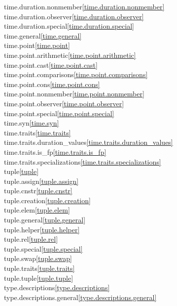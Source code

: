 \begin{multicols}{2}
time.duration.nonmember\quad\ref{time.duration.nonmember}\\
time.duration.observer\quad\ref{time.duration.observer}\\
time.duration.special\quad\ref{time.duration.special}\\
time.general\quad\ref{time.general}\\
time.point\quad\ref{time.point}\\
time.point.arithmetic\quad\ref{time.point.arithmetic}\\
time.point.cast\quad\ref{time.point.cast}\\
time.point.comparisons\quad\ref{time.point.comparisons}\\
time.point.cons\quad\ref{time.point.cons}\\
time.point.nonmember\quad\ref{time.point.nonmember}\\
time.point.observer\quad\ref{time.point.observer}\\
time.point.special\quad\ref{time.point.special}\\
time.syn\quad\ref{time.syn}\\
time.traits\quad\ref{time.traits}\\
time.traits.duration_values\quad\ref{time.traits.duration_values}\\
time.traits.is_fp\quad\ref{time.traits.is_fp}\\
time.traits.specializations\quad\ref{time.traits.specializations}\\
tuple\quad\ref{tuple}\\
tuple.assign\quad\ref{tuple.assign}\\
tuple.cnstr\quad\ref{tuple.cnstr}\\
tuple.creation\quad\ref{tuple.creation}\\
tuple.elem\quad\ref{tuple.elem}\\
tuple.general\quad\ref{tuple.general}\\
tuple.helper\quad\ref{tuple.helper}\\
tuple.rel\quad\ref{tuple.rel}\\
tuple.special\quad\ref{tuple.special}\\
tuple.swap\quad\ref{tuple.swap}\\
tuple.traits\quad\ref{tuple.traits}\\
tuple.tuple\quad\ref{tuple.tuple}\\
type.descriptions\quad\ref{type.descriptions}\\
type.descriptions.general\quad\ref{type.descriptions.general}\\

\end{multicols}
